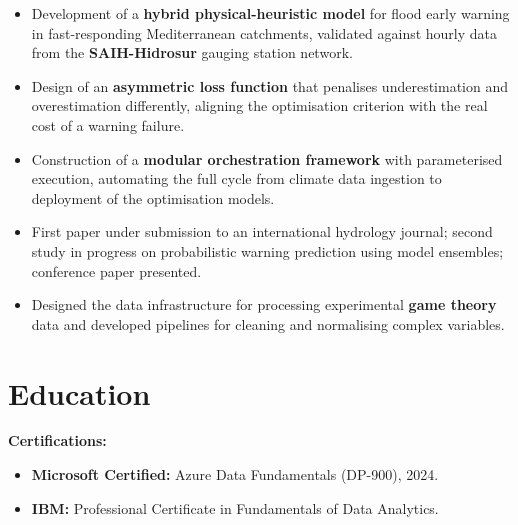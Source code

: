 \documentclass[10pt]{article}
\begin{document}
\begin{itemize}
    \item Development of a \textbf{hybrid physical-heuristic model} for flood early warning in fast-responding Mediterranean catchments, validated against hourly data from the \textbf{SAIH-Hidrosur} gauging station network.
    \item Design of an \textbf{asymmetric loss function} that penalises underestimation and overestimation differently, aligning the optimisation criterion with the real cost of a warning failure.
    \item Construction of a \textbf{modular orchestration framework} with parameterised execution, automating the full cycle from climate data ingestion to deployment of the optimisation models.
    \item First paper under submission to an international hydrology journal; second study in progress on probabilistic warning prediction using model ensembles; conference paper presented.
\end{itemize}

\begin{itemize}
    \item Designed the data infrastructure for processing experimental \textbf{game theory} data and developed pipelines for cleaning and normalising complex variables.
\end{itemize}

\section{Education}





\vspace*{0.3cm}
\textbf{Certifications:}
\begin{itemize}
    \item \textbf{Microsoft Certified:} Azure Data Fundamentals (DP-900), 2024.
    \item \textbf{IBM:} Professional Certificate in Fundamentals of Data Analytics.
\end{itemize}
\end{document}

